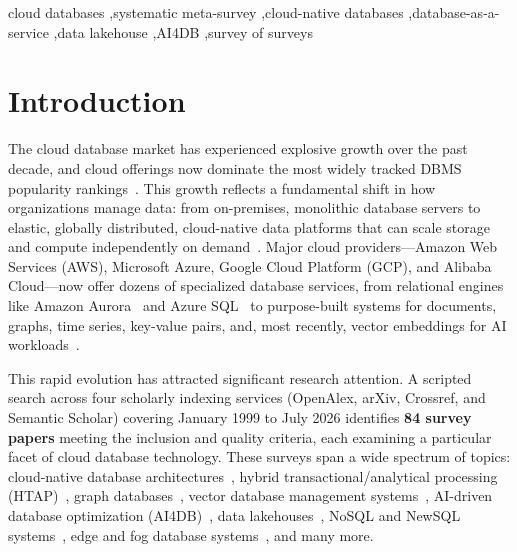 \documentclass[a4paper,fleqn]{cas-sc}
\begin{document}

\begin{keywords}
cloud databases \sep systematic meta-survey \sep cloud-native databases \sep database-as-a-service \sep data lakehouse \sep AI4DB \sep survey of surveys
\end{keywords}

\maketitle

\section{Introduction}
\label{sec:introduction}

The cloud database market has experienced explosive growth over the past decade, and cloud offerings now dominate the most widely tracked DBMS popularity rankings~\cite{dbengines2026}. This growth reflects a fundamental shift in how organizations manage data: from on-premises, monolithic database servers to elastic, globally distributed, cloud-native data platforms that can scale storage and compute independently on demand~\cite{Verbitski2017,Dageville2016}. Major cloud providers---Amazon Web Services (AWS), Microsoft Azure, Google Cloud Platform (GCP), and Alibaba Cloud---now offer dozens of specialized database services, from relational engines like Amazon Aurora~\cite{Verbitski2017} and Azure SQL~\cite{Antonopoulos2019} to purpose-built systems for documents, graphs, time series, key-value pairs, and, most recently, vector embeddings for AI workloads~\cite{Pan2024VectorDB}.

This rapid evolution has attracted significant research attention. A scripted search across four scholarly indexing services (OpenAlex, arXiv, Crossref, and Semantic Scholar) covering January 1999 to July 2026 identifies \textbf{84 survey papers} meeting the inclusion and quality criteria, each examining a particular facet of cloud database technology. These surveys span a wide spectrum of topics: cloud-native database architectures~\cite{Li2024CloudNativeSurvey}, hybrid transactional/analytical processing (HTAP)~\cite{Haas2024HTAPSurvey}, graph databases~\cite{Angles2020GraphDB}, vector database management systems~\cite{Pan2024VectorDB}, AI-driven database optimization (AI4DB)~\cite{Zhou2022AI4DB}, data lakehouses~\cite{Harby2022Lakehouse}, NoSQL and NewSQL systems~\cite{Davoudian2018NoSQL,Kaur2021NoSQLReview}, edge and fog database systems~\cite{Gomes2024EdgeFog}, and many more.
\end{document}
